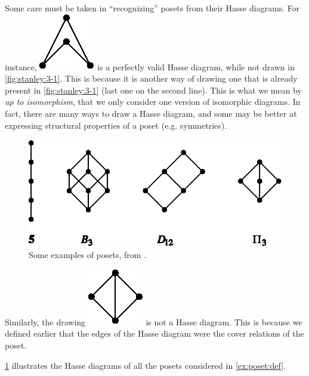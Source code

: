 Some care must be taken in ``recognizing'' posets from their Hasse diagrams.
For instance, \includegraphics{fig/stanley/3-1:a} is a perfectly
valid Hasse diagram, while not drawn in \ref{fig:stanley:3-1}. This is because
it is another way of drawing one that is already present in
\ref{fig:stanley:3-1} (last one on the second line).
This is what we mean by \emph{up to isomorphism}, \ie that we only consider one
version of isomorphic diagrams. In fact, there are many ways to draw a Hasse
diagram, and some may be better at expressing structural properties of a poset
(e.g. symmetries).


\begin{figure}
	\centering
	\includegraphics[height=0.2\textheight]{fig/stanley/3-2}
	\caption{\label{fig:stanley:3-2} Some examples of posets, from
\citet*{Stanley:2011:ECV:2124415}.}
\end{figure}


Similarly, the drawing \includegraphics{fig/stanley/3-1:b} is not a Hasse diagram.
This is because we defined earlier that the edges of
the Hasse diagram were the cover relations of the poset.


\ref{fig:stanley:3-2} illustrates the Hasse diagrams of all the posets
considered in \ref{ex:poset:def}.

